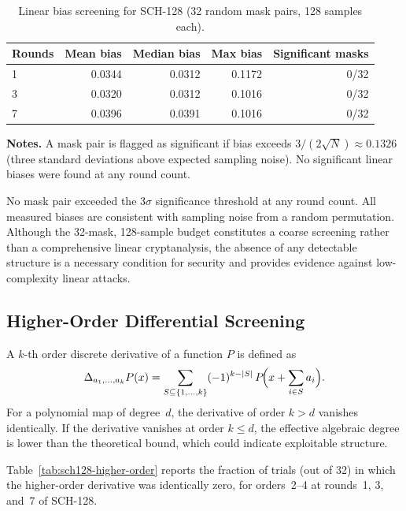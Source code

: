 ﻿\documentclass[english]{aucmcs}
\begin{document}
\begin{table}[H]
\centering
\caption{Linear bias screening for SCH-128 (32 random mask pairs, 128 samples each).}
\label{tab:sch128-linear-bias}
\begin{tabular}{@{}lrrrr@{}}
\toprule
Rounds & Mean bias & Median bias & Max bias & Significant masks \\
\midrule
1 & 0.0344 & 0.0312 & 0.1172 & 0/32 \\
3 & 0.0320 & 0.0312 & 0.1016 & 0/32 \\
7 & 0.0396 & 0.0391 & 0.1016 & 0/32 \\
\bottomrule
\end{tabular}
\vspace{0.5em}
\begin{minipage}{0.95\linewidth}
\small
\textbf{Notes.} A mask pair is flagged as significant if bias exceeds
$3/(2\sqrt{N}) \approx 0.1326$ (three standard deviations above
expected sampling noise). No significant linear biases were found at any
round count.
\end{minipage}
\end{table}

No mask pair exceeded the $3\sigma$ significance threshold at any round
count. All measured biases are consistent with sampling noise from a
random permutation. Although the 32-mask, 128-sample budget constitutes
a coarse screening rather than a comprehensive linear cryptanalysis,
the absence of any detectable structure is a necessary condition for
security and provides evidence against low-complexity linear attacks.

\subsection{Higher-Order Differential Screening}
\label{sec:higher-order}

A $k$-th order discrete derivative of a function $P$ is defined as
\[
  \Delta_{a_1, \ldots, a_k} P(x)
    = \sum_{S \subseteq \{1, \ldots, k\}} (-1)^{k - |S|}\, P\!\Bigl(x + \sum_{i \in S} a_i\Bigr).
\]
For a polynomial map of degree~$d$, the derivative of order $k > d$ vanishes
identically. If the derivative vanishes at order $k \le d$, the effective
algebraic degree is lower than the theoretical bound, which could indicate
exploitable structure.

Table~\ref{tab:sch128-higher-order} reports the fraction of trials (out of 32)
in which the higher-order derivative was identically zero, for orders~2--4
at rounds~1, 3, and~7 of SCH-128.
\end{document}
